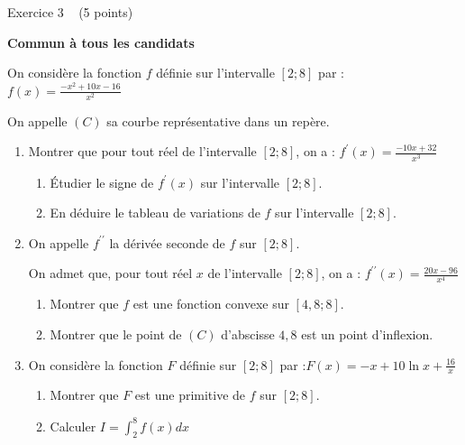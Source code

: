 
%
\begin{h2}Exercice 3   (5 points)\end{h2}
\par
\textbf{Commun à tous les candidats}
\par
On considère la fonction $f$ définie sur l'intervalle $\left[2 ; 8\right]$ par : $f\left(x\right)=\frac{-x^{2}+10x-16}{x^{2}}$
\par
On appelle $\left(C\right)$ sa courbe représentative dans un repère.
\begin{enumerate}
     \item
     Montrer que pour tout réel de l'intervalle $\left[2 ; 8\right]$, on a : $f^{\prime}\left(x\right)=\frac{-10x+32}{x^{3}}$
     \begin{enumerate}[label=\alph*.]
          \item
          Étudier le signe de $f ^{\prime}\left(x\right)$ sur l'intervalle $\left[2 ; 8\right]$.
          \item
     En déduire le tableau de variations de $f$ sur l'intervalle $\left[2 ; 8\right]$.\end{enumerate}
     \item
     On appelle $f^{\prime\prime}$ la dérivée seconde de $f$ sur $\left[2 ; 8\right]$.
     \par
     On admet que, pour tout réel $x$ de l'intervalle $\left[2 ; 8\right]$, on a : $f^{\prime\prime}\left(x\right)=\frac{20x-96}{x^{4}}$
     \begin{enumerate}[label=\alph*.]
          \item
          Montrer que $f$ est une fonction convexe sur $\left[4,8 ; 8\right]$.
          \item
     Montrer que le point de $\left(C\right)$ d'abscisse $4,8$ est un point d'inflexion.\end{enumerate}
     \item
     On considère la fonction $F$ définie sur $\left[2 ; 8\right]$ par :$F\left(x\right)=-x+10\ln x +\frac{16}{x}$
     \begin{enumerate}[label=\alph*.]
          \item
          Montrer que $F$ est une primitive de $f$ sur  $\left[2 ; 8\right]$.
          \item
     Calculer  $I=\int_{2}^{8} f\left(x\right)dx$
\end{enumerate}
\end{enumerate}


